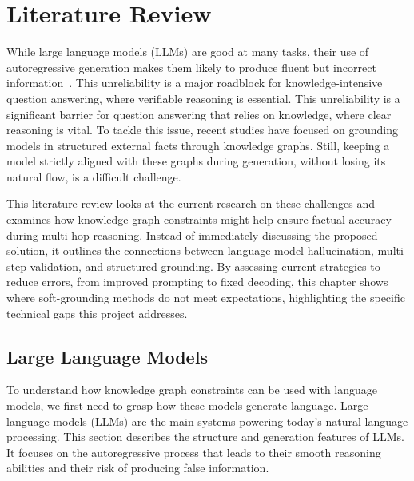 
\chapter{Literature Review}


While large language models (LLMs) are good at many tasks, their use of autoregressive generation makes them likely to produce fluent but incorrect information~\citep{ji2023survey}. This unreliability is a major roadblock for knowledge-intensive question answering, where verifiable reasoning is essential. This unreliability is a significant barrier for question answering that relies on knowledge, where clear reasoning is vital. To tackle this issue, recent studies have focused on grounding models in structured external facts through knowledge graphs. Still, keeping a model strictly aligned with these graphs during generation, without losing its natural flow, is a difficult challenge.

This literature review looks at the current research on these challenges and examines how knowledge graph constraints might help ensure factual accuracy during multi-hop reasoning. Instead of immediately discussing the proposed solution, it outlines the connections between language model hallucination, multi-step validation, and structured grounding. By assessing current strategies to reduce errors, from improved prompting to fixed decoding, this chapter shows where soft-grounding methods do not meet expectations, highlighting the specific technical gaps this project addresses.


\section{Large Language Models}
\label{sec:llms}

To understand how knowledge graph constraints can be used with language models, we first need to grasp how these models generate language. Large language models (LLMs) are the main systems powering today’s natural language processing. This section describes the structure and generation features of LLMs. It focuses on the autoregressive process that leads to their smooth reasoning abilities and their risk of producing false information.

